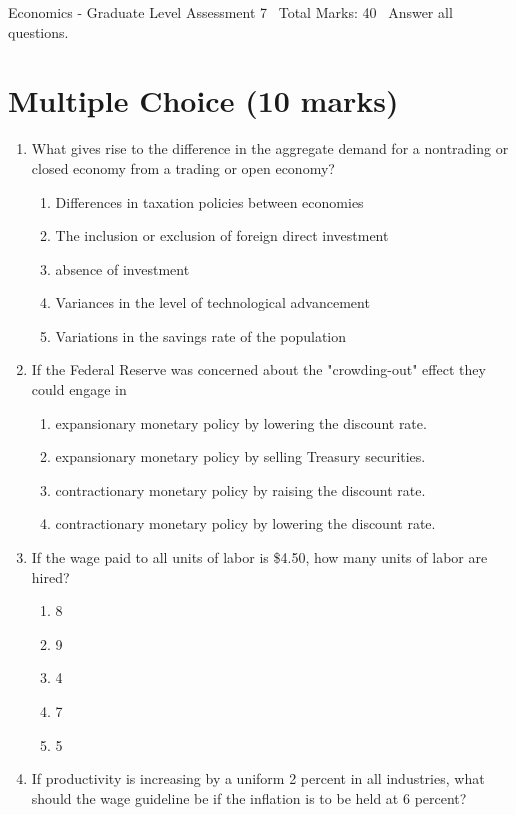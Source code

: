 \documentclass[12pt]{article}
\begin{document}
\begin{center}
Economics - Graduate Level Assessment 7 \
Total Marks: 40 \
Answer all questions.
\end{center}

\section*{Multiple Choice (10 marks)}
\begin{enumerate}[label=\arabic*.]
\item What gives rise to the difference in the aggregate demand for a nontrading or closed economy from a trading or open economy?
\begin{enumerate}[label=(\alph*)]
    \item Differences in taxation policies between economies
    \item The inclusion or exclusion of foreign direct investment
    \item absence of investment
    \item Variances in the level of technological advancement
    \item Variations in the savings rate of the population
\end{enumerate}
\item If the Federal Reserve was concerned about the "crowding-out" effect they could engage in
\begin{enumerate}[label=(\alph*)]
    \item expansionary monetary policy by lowering the discount rate.
    \item expansionary monetary policy by selling Treasury securities.
    \item contractionary monetary policy by raising the discount rate.
    \item contractionary monetary policy by lowering the discount rate.
\end{enumerate}
\item If the wage paid to all units of labor is \$4.50, how many units of labor are hired?
\begin{enumerate}[label=(\alph*)]
    \item 8
    \item 9
    \item 4
    \item 7
    \item 5
\end{enumerate}
\item If productivity is increasing by a uniform 2 percent in all industries, what should the wage guideline be if the inflation is to be held at 6 percent?

\end{enumerate}
\end{document}
